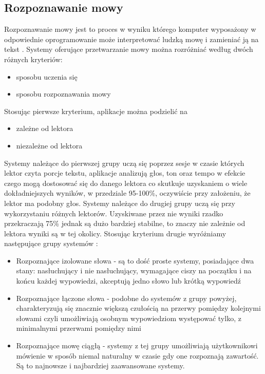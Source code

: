 \subsection{Rozpoznawanie mowy}
Rozpoznawanie mowy jest to proces w wyniku którego komputer wyposażony w odpowiednie oprogramowanie może interpretować ludzką mowę i zamieniać ją na tekst \cite{douglas2002}. Systemy oferujące przetwarzanie mowy można rozróżniać	 według dwóch różnych kryteriów:
\begin{itemize}
	\item sposobu uczenia się
	\item sposobu rozpoznawania mowy
\end{itemize}
Stosując pierwsze kryterium, aplikacje można podzielić na
\begin{itemize}
	\item zależne od lektora
	\item niezależne od lektora
\end{itemize}
Systemy należące do pierwszej grupy uczą się poprzez sesje w czasie których lektor czyta porcje tekstu, aplikacje analizują głos, ton oraz tempo  w efekcie czego mogą dostosować się do danego lektora co skutkuje uzyskaniem o wiele dokładniejszych wyników, w przedziale 95-100\%, oczywiście przy założeniu, że lektor ma podobny głos.  Systemy należące do drugiej grupy uczą się przy wykorzystaniu różnych lektorów. Uzyskiwane przez nie wyniki rzadko przekraczają 75\% jednak są dużo bardziej stabilne, to znaczy nie zależnie od lektora wyniki są w tej okolicy. 
Stosując kryterium drugie wyróżniamy następujące grupy systemów \cite{gaikwad2010} :
\begin{itemize}
	\item Rozpoznające izolowane słowa - są to dość proste systemy, posiadające dwa stany: nasłuchujący i nie nasłuchujący,  wymagające ciszy na początku i na końcu każdej wypowiedzi,  akceptują jedno słowo lub krótką wypowiedź 
	\item Rozpoznające łączone słowa - podobne do systemów z grupy powyżej, charakteryzują się znacznie większą czułością na przerwy pomiędzy kolejnymi słowami czyli umożliwiają osobnym wypowiedziom występować tylko, z minimalnymi przerwami pomiędzy nimi
	\item Rozpoznające mowę ciągłą -  systemy z tej grupy umożliwiają użytkownikowi mówienie w sposób niemal naturalny w czasie gdy one rozpoznają zawartość. Są to najnowsze i najbardziej zaawansowane systemy.
\end{itemize}
